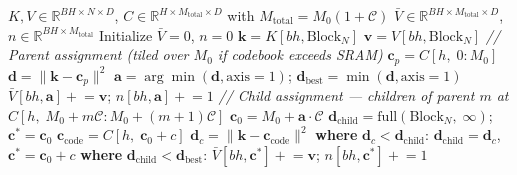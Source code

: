 \begin{algorithm}[ht!]
\caption{VQ Precompute kernel.}
\label{alg:vqprecompute}
\begin{algorithmic}[1]
\Require $K, V \in \mathbb{R}^{BH \times N \times D}$, \; $C \in \mathbb{R}^{H \times M_{\text{total}} \times D}$ with $M_{\text{total}} = M_0(1+\mathcal{C})$
\Ensure $\bar{V} \in \mathbb{R}^{BH \times M_{\text{total}} \times D}$, \; $n \in \mathbb{R}^{BH \times M_{\text{total}}}$
\State Initialize $\bar{V} = 0$, $n = 0$
 
    \State $\mathbf{k} = K[bh, \text{Block}_N]$ 
    \State $\mathbf{v} = V[bh, \text{Block}_N]$ 
    \Statex \quad \textit{// Parent assignment (tiled over $M_0$ if codebook exceeds SRAM)}
    \State $\mathbf{c}_p = C[h,\; 0\!:\!M_0]$ 
    \State $\mathbf{d} = \|\mathbf{k} - \mathbf{c}_p\|^2$ 
    \State $\mathbf{a} = \arg\min(\mathbf{d}, \text{axis}{=}1)$; \quad $\mathbf{d}_{\text{best}} = \min(\mathbf{d}, \text{axis}{=}1)$ 
    \State $\bar{V}[bh, \mathbf{a}] \mathrel{+}= \mathbf{v}$; \quad $n[bh, \mathbf{a}] \mathrel{+}= 1$ 
    \Statex \quad \textit{// Child assignment --- children of parent $m$ at $C[h,\; M_0 + m\mathcal{C}\!:\!M_0 + (m{+}1)\mathcal{C}]$}
    \State $\mathbf{c}_0 = M_0 + \mathbf{a} \cdot \mathcal{C}$ 
    \State $\mathbf{d}_{\text{child}} = \text{full}(\text{Block}_N,\; \infty)$; \quad $\mathbf{c}^* = \mathbf{c}_0$
        \State $\mathbf{c}_{\text{code}} = C[h,\; \mathbf{c}_0 + c]$ 
        \State $\mathbf{d}_c = \|\mathbf{k} - \mathbf{c}_{\text{code}}\|^2$ 
        \State \textbf{where} $\mathbf{d}_c < \mathbf{d}_{\text{child}}$: \; $\mathbf{d}_{\text{child}} = \mathbf{d}_c$, \; $\mathbf{c}^* = \mathbf{c}_0 + c$
    \EndFor
    \State \textbf{where} $\mathbf{d}_{\text{child}} < \mathbf{d}_{\text{best}}$: \; $\bar{V}[bh, \mathbf{c}^*] \mathrel{+}= \mathbf{v}$; \quad $n[bh, \mathbf{c}^*] \mathrel{+}= 1$ 
\EndFor
\end{algorithmic}
\end{algorithm}
